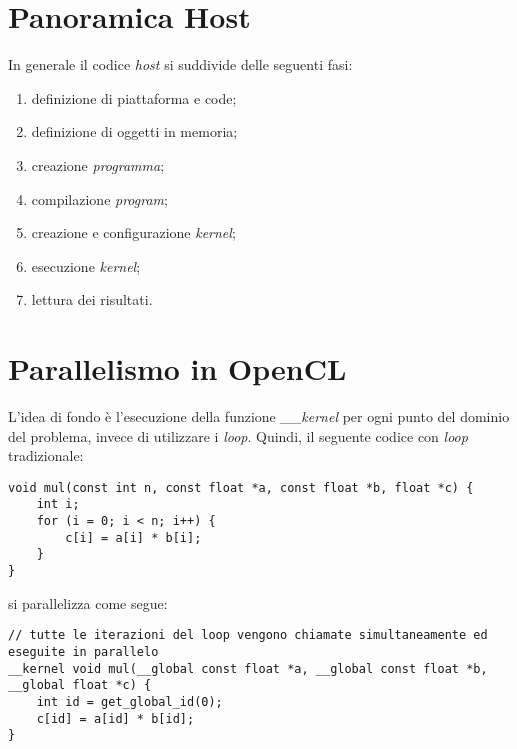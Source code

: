 \section{Panoramica Host}
In generale il codice \textit{host} si suddivide delle seguenti fasi:
\begin{enumerate}
	\item definizione di piattaforma e code;
	\item definizione di oggetti in memoria;
	\item creazione \textit{programma};
	\item compilazione \textit{program};
	\item creazione e configurazione \textit{kernel};
	\item esecuzione \textit{kernel};
	\item lettura dei risultati.
\end{enumerate}

\section{Parallelismo in OpenCL}
L'idea di fondo è l'esecuzione della funzione \textit{\_\_kernel} per ogni punto del dominio del problema, invece di utilizzare i \textit{loop}. Quindi, il seguente codice con \textit{loop} tradizionale:
\begin{lstlisting}
void mul(const int n, const float *a, const float *b, float *c) {
	int i;
	for (i = 0; i < n; i++) {
		c[i] = a[i] * b[i];
	}
}
\end{lstlisting}
si parallelizza come segue:
\begin{lstlisting}
// tutte le iterazioni del loop vengono chiamate simultaneamente ed eseguite in parallelo
__kernel void mul(__global const float *a, __global const float *b, __global float *c) {
	int id = get_global_id(0);
	c[id] = a[id] * b[id];
}
\end{lstlisting}

